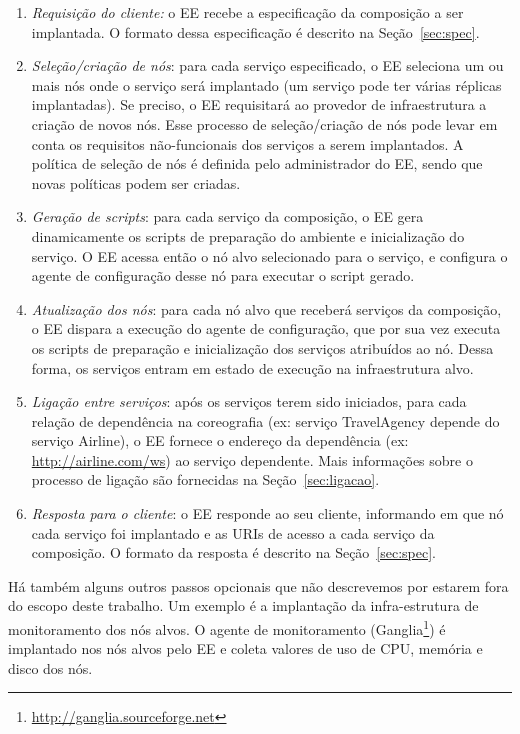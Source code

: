 \begin{enumerate}

\item \emph{Requisição do cliente:} o EE recebe a especificação da composição a ser implantada.
O formato dessa especificação é descrito na Seção~\ref{sec:spec}.

\item \emph{Seleção/criação de nós}: para cada serviço especificado, o EE seleciona um ou mais nós 
onde o serviço será implantado (um serviço pode ter várias réplicas implantadas). 
Se preciso, o EE requisitará ao provedor de infraestrutura a criação de novos nós.
Esse processo de seleção/criação de nós pode levar em conta os requisitos não-funcionais
dos serviços a serem implantados.
A política de seleção de nós é definida pelo administrador do EE, sendo que novas políticas podem ser criadas.

\item \emph{Geração de scripts}: para cada serviço da composição, 
o EE gera dinamicamente os scripts de preparação do ambiente e inicialização do serviço. 
O EE acessa então o nó alvo selecionado para o serviço,
e configura o agente de configuração desse nó para executar o script gerado.

\item \emph{Atualização dos nós}: para cada nó alvo que receberá serviços da composição,
o EE dispara a execução do agente de configuração, que por sua vez executa os scripts 
de preparação e inicialização dos serviços atribuídos ao nó.
Dessa forma, os serviços entram em estado de execução na infraestrutura alvo.

\item \emph{Ligação entre serviços}: após os serviços terem sido iniciados, 
para cada relação de dependência na coreografia (ex: serviço \textsf{TravelAgency}
depende do serviço \textsf{Airline}), o EE fornece o endereço da dependência 
(ex: \url{http://airline.com/ws}) ao serviço dependente.
Mais informações sobre o processo de ligação são fornecidas na Seção~\ref{sec:ligacao}.

\item \emph{Resposta para o cliente}: o EE responde ao seu cliente,
informando em que nó cada serviço foi implantado
e as URIs de acesso a cada serviço da composição.
O formato da resposta é descrito na Seção~\ref{sec:spec}.

\end{enumerate}

Há também alguns outros passos opcionais que não descrevemos por estarem fora
do escopo deste trabalho. Um exemplo é a implantação da infra-estrutura de monitoramento
dos nós alvos. O agente de monitoramento 
(Ganglia\footnote{\url{http://ganglia.sourceforge.net}})
é implantado nos nós alvos pelo EE e
coleta valores de uso de CPU, memória e disco dos nós.

